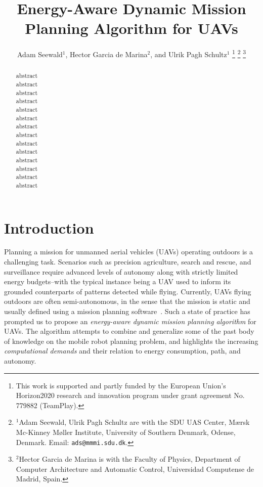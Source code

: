 \documentclass[letterpaper,10pt,conference]{ieeeconf}
\title{\LARGE \bf
Energy-Aware Dynamic Mission Planning Algorithm for UAVs
}
\author{
  Adam Seewald$^{1}$, Hector Garcia de Marina$^{2}$, and Ulrik Pagh Schultz$^{1}$
  \thanks{This work is supported and partly funded by the European Union's Horizon2020 research and innovation program under grant agreement No. 779882 (TeamPlay).
  }
  \thanks{$^{1}$Adam Seewald, Ulrik Pagh Schultz are with the SDU UAS Center, M{\ae}rsk Mc-Kinney M{\o}ller Institute, University of Southern Denmark, Odense, Denmark. Email: {\tt\small ads@mmmi.sdu.dk}.}
  \thanks{$^{2}$Hector Garcia de Marina is with the Faculty of Physics, Department of Computer Architecture and Automatic Control, Universidad Computense de Madrid, Spain.}
}
\theoremstyle{definition}
\begin{document}
\maketitle

\thispagestyle{empty}
\pagestyle{empty}

\begin{abstract}

  abstract\\
  abstract\\
  abstract\\
  abstract\\
  abstract\\
  abstract\\
  abstract\\
  abstract\\
  abstract\\
  abstract\\
  abstract\\
  abstract\\
  abstract\\
  abstract
\end{abstract}

%
\IEEEpeerreviewmaketitle


\section{Introduction}
\label{sec:intro}

Planning a mission for unmanned aerial vehicles (UAVs) operating outdoors is a challenging task. Scenarios such as precision agriculture, search and rescue, and surveillance require advanced levels of autonomy along with strictly limited energy budgets--with the typical instance being a UAV used to inform its grounded counterparts of patterns detected while flying. Currently, UAVs flying outdoors are often semi-autonomous, in the sense that the mission is static and usually defined using a mission planning software~\cite{daponte2019review}. Such a state of practice has prompted us to propose an \emph{energy-aware dynamic mission planning algorithm} for UAVs. The algorithm attempts to combine and generalize some of the past body of knowledge on the mobile robot planning problem, and highlights the increasing \emph{computational demands} and their relation to energy consumption, path, and autonomy.
\end{document}
